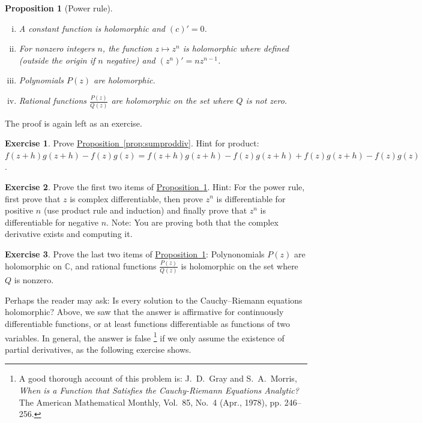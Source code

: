 \documentclass[12pt,openany]{book}
\newcommand{\C}{{\mathbb{C}}}
\theoremstyle{plain}
\newtheorem{prop}[thm]{Proposition}
\theoremstyle{remark}
\theoremstyle{definition}
\newenvironment{exbox}{%
    \def\FrameCommand{\vrule width 1pt \relax\hspace{10pt}}%
    \MakeFramed{\advance\hsize-\width\FrameRestore}%
}{%
    \endMakeFramed
}
\theoremstyle{exercise}
\newtheorem{exercise}{Exercise}[section]
\theoremstyle{example}
\newcommand{\propref}[1]{\hyperref[#1]{Proposition~\ref*{#1}}}
\begin{document}
\begin{prop}[Power rule] \label{prop:powerrule}
\leavevmode
\begin{enumerate}[(i)]
\item A constant function is holomorphic and $(c)' = 0$.
\item For nonzero integers $n$, the function $z \mapsto z^n$ is holomorphic
where defined (outside the origin if $n$ negative) and $(z^n)' = n z^{n-1}$.
\item Polynomials $P(z)$ are holomorphic.
\item Rational functions $\frac{P(z)}{Q(z)}$
are holomorphic on the set where $Q$ is not zero.
\end{enumerate}
\end{prop}

The proof is again left as an exercise.

\begin{exbox}
\begin{exercise}
Prove \propref{prop:sumproddiv}.
Hint for product: 
$f(z+h)g(z+h) - f(z)g(z) =
f(z+h)g(z+h) - f(z)g(z+h) +
f(z)g(z+h) - f(z)g(z)$.
\end{exercise}

\begin{exercise}
Prove the first two items of \propref{prop:powerrule}.
Hint: For the power rule, first prove that $z$ is complex differentiable,
then prove $z^n$ is differentiable for positive $n$ (use product rule and
induction) and finally prove
that $z^n$ is differentiable for negative $n$.
Note: You are proving both that the complex derivative exists and
computing it.
\end{exercise}

\begin{exercise}
Prove the last two items of \propref{prop:powerrule}:
Polynonomials $P(z)$ are holomorphic on $\C$,
and rational functions
$\frac{P(z)}{Q(z)}$ is holomorphic on the set where $Q$ is nonzero.
\end{exercise}
\end{exbox}

Perhaps the reader may ask:
Is every solution to
the Cauchy--Riemann equations holomorphic?  Above, we saw that the answer
is affirmative for continuously differentiable functions, or at least
functions differentiable as functions of two variables.
In general, the answer is false%
\footnote{%
A good thorough account of this problem is:
J.\ D.\ Gray and  S.\ A.\ Morris,
\emph{When is a Function that Satisfies the Cauchy-Riemann Equations
Analytic?}  The American Mathematical Monthly, Vol.\ 85, No.\ 4 (Apr.,
1978), pp. 246--256.} if we only assume the existence of partial derivatives,
as the following exercise shows.
\end{document}
